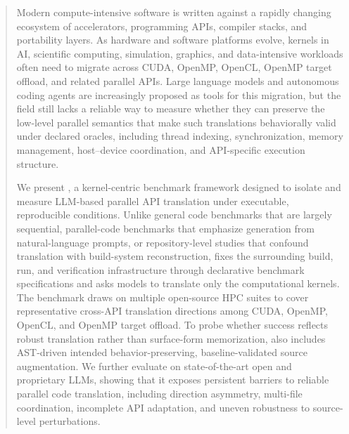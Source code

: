 \begin{abstract}
Modern compute-intensive software is written against a rapidly changing ecosystem of accelerators, programming APIs, compiler stacks, and portability layers. As hardware and software platforms evolve, kernels in AI, scientific computing, simulation, graphics, and data-intensive workloads often need to migrate across CUDA, OpenMP, OpenCL, OpenMP target offload, and related parallel APIs. Large language models and autonomous coding agents are increasingly proposed as tools for this migration, but the field still lacks a reliable way to measure whether they can preserve the low-level parallel semantics that make such translations behaviorally valid under declared oracles, including thread indexing, synchronization, memory management, host--device coordination, and API-specific execution structure.

We present \parbench{}, a kernel-centric benchmark framework designed to isolate and measure LLM-based parallel API translation under executable, reproducible conditions. Unlike general code benchmarks that are largely sequential, parallel-code benchmarks that emphasize generation from natural-language prompts, or repository-level studies that confound translation with build-system reconstruction, \parbench{} fixes the surrounding build, run, and verification infrastructure through declarative benchmark specifications and asks models to translate only the computational kernels. The benchmark draws on multiple open-source HPC suites to cover representative cross-API translation directions among CUDA, OpenMP, OpenCL, and OpenMP target offload. To probe whether success reflects robust translation rather than surface-form memorization, \parbench{} also includes AST-driven intended behavior-preserving, baseline-validated source augmentation. We further evaluate \parbench{} on state-of-the-art open and proprietary LLMs, showing that it exposes persistent barriers to reliable parallel code translation, including direction asymmetry, multi-file coordination, incomplete API adaptation, and uneven robustness to source-level perturbations.
\end{abstract}


